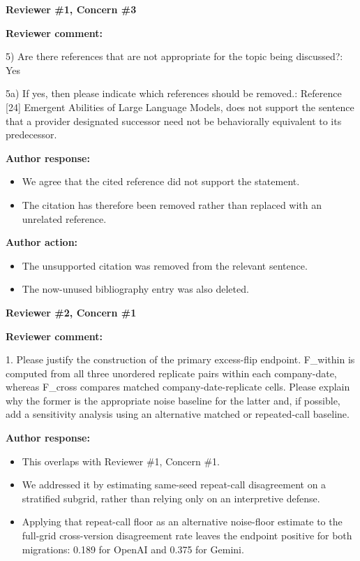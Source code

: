 \documentclass[11pt]{article}
\newcommand{\rvcomment}[1]{{\color{ReviewerGreen}#1}}
\newcommand{\concern}[1]{\textbf{\color{ReviewerGreen}#1}}
\begin{document}
\vspace{12pt}
\concern{Reviewer \#1, Concern \#3}

\concern{Reviewer comment:}

\rvcomment{5) Are there references that are not appropriate for the topic being discussed?: Yes}

\rvcomment{5a) If yes, then please indicate which references should be removed.: Reference [24] Emergent Abilities of Large Language Models, does not support the sentence that a provider designated successor need not be behaviorally equivalent to its predecessor.}

\textbf{Author response:}

\begin{itemize}

\item We agree that the cited reference did not support the statement.

\item The citation has therefore been removed rather than replaced with an unrelated reference.

\end{itemize}

\textbf{Author action:}

\begin{itemize}

\item The unsupported citation was removed from the relevant sentence.

\item The now-unused bibliography entry was also deleted.

\end{itemize}

\vspace{12pt}
\concern{Reviewer \#2, Concern \#1}

\concern{Reviewer comment:}

\rvcomment{1. Please justify the construction of the primary excess-flip endpoint. F\_within is computed from all three unordered replicate pairs within each company-date, whereas F\_cross compares matched company-date-replicate cells. Please explain why the former is the appropriate noise baseline for the latter and, if possible, add a sensitivity analysis using an alternative matched or repeated-call baseline.}

\textbf{Author response:}

\begin{itemize}

\item This overlaps with Reviewer \#1, Concern \#1.

\item We addressed it by estimating same-seed repeat-call disagreement on a stratified subgrid, rather than relying only on an interpretive defense.

\item Applying that repeat-call floor as an alternative noise-floor estimate to the full-grid cross-version disagreement rate leaves the endpoint positive for both migrations: 0.189 for OpenAI and 0.375 for Gemini.

\end{itemize}
\end{document}
